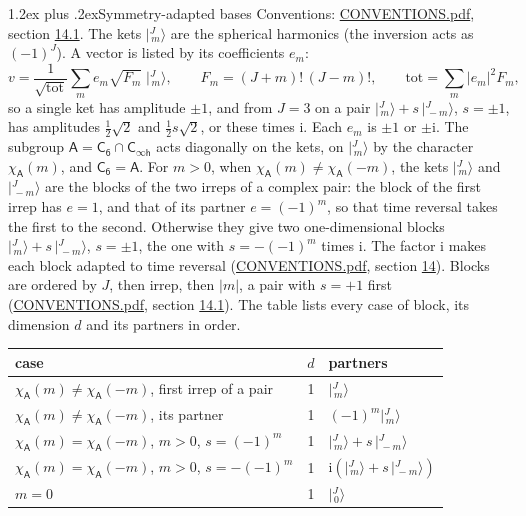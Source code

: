 \documentclass[10pt,a4paper]{article}
\makeatletter
\renewcommand\section{\@startsection{section}{1}{\z@}{-3ex plus -1ex minus -.2ex}%
  {1.2ex plus .2ex}{\normalfont\large\sffamily\bfseries\color{parttitle}}}
\numberwithin{equation}{section}
\newcommand{\grp}[1]{\mathsf{#1}}
\newcommand{\iunit}{\mathrm{i}}
\newcommand{\chiA}{\chi_{\grp{A}}}
\newcommand{\jm}[2]{\bigl\lvert{}^{#1}_{\,#2}\bigr\rangle}
\makeatother
\begin{document}
\section{Symmetry-adapted bases}\label{s:bases}
Conventions: \href{../../CONVENTIONS.pdf}{CONVENTIONS.pdf}, section \href{../../CONVENTIONS.pdf\#conv.14.1}{14.1}.
\leavevmode\label{n:index.m}\label{n:vector.ket}The kets $\jm{J}{m}$ are the spherical harmonics (the inversion acts as $(-1)^J$). \label{n:index.ketcoefficient}\label{n:vector.basis.symmetry}\label{n:index.ketweight}\label{n:index.total}A vector is listed by its coefficients $e_m$:
\begin{equation}\label{e:ket}v = \frac{1}{\sqrt{\mathrm{tot}}}\sum_m e_m\sqrt{F_m}\;\jm{J}{m},\qquad F_m = (J+m)!\,(J-m)!,\qquad \mathrm{tot} = \sum_m |e_m|^2F_m,\end{equation}
\leavevmode\label{n:index.pair.sign}so a single ket has amplitude $\pm1$, and from $J = 3$ on a pair $\jm{J}{m} + s\,\jm{J}{-m}$, $s = \pm1$, has amplitudes $\tfrac{1}{2}\sqrt{2}$ and $\tfrac{1}{2}s\sqrt{2}$, or these times $\iunit$. Each $e_m$ is $\pm1$ or $\pm\iunit$.
\leavevmode\label{n:group.A}\label{n:function.character.abelian}The subgroup $\grp{A} = \grp{C_{6}}\cap\grp{C_{\infty h}}$ acts diagonally on the kets, on $\jm{J}{m}$ by the character $\chiA(m)$, and $\grp{C_{6}} = \grp{A}$. For $m > 0$, when $\chiA(m) \ne \chiA(-m)$, the kets $\jm{J}{m}$ and $\jm{J}{-m}$ are the blocks of the two irreps of a complex pair: the block of the first irrep has $e = 1$, and that of its partner $e = (-1)^m$, so that time reversal takes the first to the second. Otherwise they give two one-dimensional blocks $\jm{J}{m} + s\,\jm{J}{-m}$, $s = \pm1$, the one with $s = -(-1)^m$ times $\iunit$. The factor $\iunit$ makes each block adapted to time reversal (\href{../../CONVENTIONS.pdf}{CONVENTIONS.pdf}, section \href{../../CONVENTIONS.pdf\#conv.14}{14}). Blocks are ordered by $J$, then irrep, then $|m|$, a pair with $s = +1$ first (\href{../../CONVENTIONS.pdf}{CONVENTIONS.pdf}, section \href{../../CONVENTIONS.pdf\#conv.14.1}{14.1}).
\leavevmode\label{n:head.case}\label{n:head.partners}The table lists every case of block, its dimension $d$ and its partners in order.
\begin{center}\begin{tabular}{@{}lrl@{}}\toprule
case & $d$ & partners\\\midrule
$\chiA(m) \ne \chiA(-m)$, first irrep of a pair & 1 & $\jm{J}{m}$\\
$\chiA(m) \ne \chiA(-m)$, its partner & 1 & $(-1)^m\jm{J}{m}$\\
$\chiA(m) = \chiA(-m)$, $m > 0$, $s = (-1)^m$ & 1 & $\jm{J}{m} + s\,\jm{J}{-m}$\\
$\chiA(m) = \chiA(-m)$, $m > 0$, $s = -(-1)^m$ & 1 & $\iunit(\jm{J}{m} + s\,\jm{J}{-m})$\\
$m = 0$ & 1 & $\jm{J}{0}$\\
\bottomrule\end{tabular}\end{center}
\end{document}
